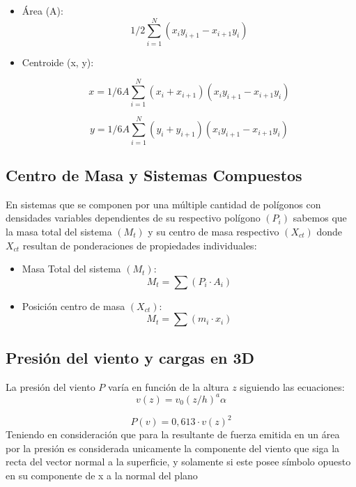 \documentclass[]{article}
\begin{document}
\begin{itemize}
	\item Área (A):
\begin{equation}
	1/2\sum_{i=1}^{N} (x_iy_{i+1} - x_{i+1}y_i)
\end{equation}
	\item Centroide (x, y):

\begin{equation}
	x = 1/{6A}\sum_{i=1}^{N} (x_i + x_{i+1})(x_iy_{i+1} - x_{i+1}y_i)
\end{equation}

\begin{equation}
	y = 1/{6A}\sum_{i=1}^{N} (y_i + y_{i+1})(x_iy_{i+1} - x_{i+1}y_i)
\end{equation}

\end{itemize}

\subsection{Centro de Masa y Sistemas Compuestos}
En sistemas que se componen por una múltiple cantidad de polígonos con densidades variables dependientes de su respectivo polígono $(P_i)$ sabemos que la masa total del sistema $(M_t)$ y su centro de masa respectivo $(X_{ct})$ donde $X_{ct}$ resultan de ponderaciones de propiedades individuales:
\begin{itemize}
	\item Masa Total del sistema $(M_t)$:
\begin{equation}
	M_t = \sum(P_i \cdot A_i)
\end{equation}
	
	\item Posición centro de masa $(X_{ct})$:
\begin{equation}
	M_t = \sum(m_i \cdot x_i)
\end{equation}
\end{itemize}

\subsection{Presión del viento y cargas en 3D}
La presión del viento $P$ varía en función de la altura $z$ siguiendo las ecuaciones:
\begin{equation}
	v(z) = v_0(z/h)^a\alpha
\end{equation}

\begin{equation}
	P(v) = 0,613 \cdot v(z)^2
\end{equation}
Teniendo en consideración que para la resultante de fuerza emitida en un área por la presión es considerada unicamente la componente del viento que siga la recta del vector normal a la superficie, y solamente si este posee símbolo opuesto en su componente de x a la normal del plano
\end{document}
